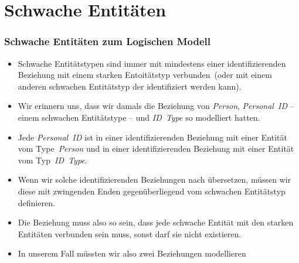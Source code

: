 \documentclass[aspectratio=169,mathserif,notheorems]{beamer}%
\begin{document}
\section{Schwache Entitäten}%
%
\begin{frame}[t]%
\frametitle{Schwache Entitäten zum Logischen Modell}%
\begin{itemize}%
%
\item Schwache Entitätstypen sind immer mit mindestens einer identifizierenden Beziehung mit einem starken Entoitätstyp verbunden\cite{S2024D:MEDTRDM}~(oder mit einem anderen schwachen Entitätstyp der identifiziert werden kann).%
%
\item<2-> Wir erinnern uns, dass wir damals die Beziehung von \emph{Person}, \emph{Personal~ID} -- einem schwachen Entitätstype -- und \emph{ID~Type} so modelliert hatten.%
%
\item<3-> Jede \emph{Personal~ID} ist in einer identifizierenden Beziehung mit einer Entität vom Type~\emph{Person} und in einer identifizierenden Beziehung mit einer Entität vom Typ~\emph{ID~Type}.
%
\item<4-> Wenn wir solche identifizierenden Beziehungen nach  übersetzen, müssen wir diese mit zwingenden Enden gegenüberliegend vom schwachen Entitätstyp definieren.%
%
\item<5-> Die Beziehung muss also so sein, dass jede schwache Entität mit den starken Entitäten verbunden sein muss, sonst darf sie nicht existieren.%
%
\item<6-> In unserem Fall müssten wir also zwei Beziehungen modellieren%
\end{itemize}%
%
%
\end{frame}%
%
\end{document}
